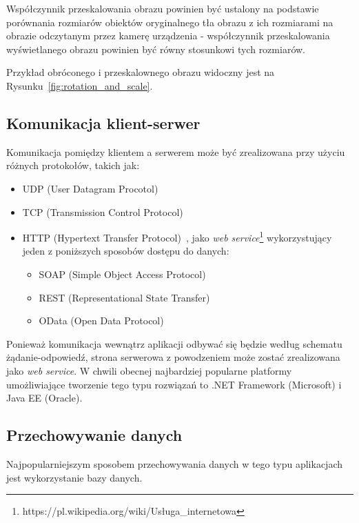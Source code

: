 Współczynnik przeskalowania obrazu powinien być ustalony na podstawie porównania rozmiarów obiektów oryginalnego tła obrazu z ich rozmiarami na obrazie odczytanym przez kamerę urządzenia - współczynnik przeskalowania wyświetlanego obrazu powinien być równy stosunkowi tych rozmiarów.

Przykład obróconego i przeskalownego obrazu widoczny jest na Rysunku~\ref{fig:rotation_and_scale}.



\subsection{Komunikacja klient-serwer}
Komunikacja pomiędzy klientem a serwerem może być zrealizowana przy użyciu różnych protokołów, takich jak:
\begin{itemize}
 \item UDP (User Datagram Procotol)~\cite{udp}
 \item TCP (Transmission Control Protocol)~\cite{tcp}
 \item HTTP (Hypertext Transfer Protocol)~\cite{http1,http2}, jako \emph{web service}\footnote{https://pl.wikipedia.org/wiki/Usługa\_internetowa} wykorzystujący jeden z poniższych sposobów dostępu do danych:
  \begin{itemize}
   \item SOAP (Simple Object Access Protocol)~\cite{soap}
   \item REST (Representational State Transfer)~\cite{rest}
   \item OData (Open Data Protocol)~\cite{odata}
  \end{itemize}
\end{itemize}

Ponieważ komunikacja wewnątrz aplikacji odbywać się będzie według schematu żądanie-odpowiedź, strona serwerowa z powodzeniem może zostać zrealizowana jako \emph{web service}.
W chwili obecnej najbardziej popularne platformy umożliwiające tworzenie tego typu rozwiązań to .NET Framework (Microsoft) i Java EE (Oracle).

\subsection{Przechowywanie danych}
Najpopularniejszym sposobem przechowywania danych w tego typu aplikacjach jest wykorzystanie bazy danych.